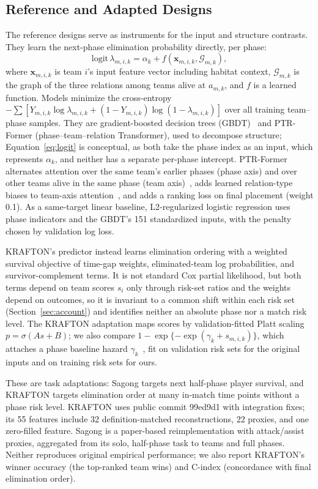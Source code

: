 \documentclass[sigconf,anonymous,nonacm]{acmart}
\begin{document}
\subsection{Reference and Adapted Designs}
\label{sec:method:rq2}
The reference designs serve as instruments for the input and structure contrasts. They learn the next-phase elimination probability directly, per phase:
\begin{equation}
\mathrm{logit}\,\lambda_{m,i,k}=\alpha_k+f(\mathbf{x}_{m,i,k},\mathcal{G}_{m,k}),
\label{eq:logit}
\end{equation}
where $\mathbf{x}_{m,i,k}$ is team $i$'s input feature vector including habitat context, $\mathcal{G}_{m,k}$ is the graph of the three relations among teams alive at $a_{m,k}$, and $f$ is a learned function.
Models minimize the cross-entropy $-\sum[Y_{m,i,k}\log\lambda_{m,i,k}+(1-Y_{m,i,k})\log(1-\lambda_{m,i,k})]$ over all training team--phase samples.
They are gradient-boosted decision trees (GBDT)~\cite{Friedman01} and PTR-Former (phase--team--relation Transformer), used to decompose structure; Equation~\eqref{eq:logit} is conceptual, as both take the phase index as an input, which represents $\alpha_k$, and neither has a separate per-phase intercept.
PTR-Former alternates attention over the same team's earlier phases (phase axis) and over other teams alive in the same phase (team axis)~\cite{Vaswani17,Ngiam22}, adds learned relation-type biases to team-axis attention~\cite{Ying21}, and adds a ranking loss on final placement (weight 0.1). As a same-target linear baseline, L2-regularized logistic regression uses phase indicators and the GBDT's 151 standardized inputs, with the penalty chosen by validation log loss.

KRAFTON's predictor instead learns elimination ordering with a weighted survival objective of time-gap weights, eliminated-team log probabilities, and survivor-complement terms. It is not standard Cox partial likelihood, but both terms depend on team scores $s_i$ only through risk-set ratios and the weights depend on outcomes, so it is invariant to a common shift within each risk set (Section~\ref{sec:account}) and identifies neither an absolute phase nor a match risk level. The KRAFTON adaptation maps scores by validation-fitted Platt scaling $p=\sigma(A s+B)$; we also compare $1-\exp\{-\exp(\gamma_k+s_{m,i,k})\}$, which attaches a phase baseline hazard $\gamma_k$~\cite{PrenticeGloeckler78}, fit on validation risk sets for the original inputs and on training risk sets for ours.

These are task adaptations: Sagong targets next half-phase player survival, and KRAFTON targets elimination order at many in-match time points without a phase risk level. KRAFTON uses public commit 99ed9d1 with integration fixes; its 55 features include 32 definition-matched reconstructions, 22 proxies, and one zero-filled feature. Sagong is a paper-based reimplementation with attack/assist proxies, aggregated from its solo, half-phase task to teams and full phases. Neither reproduces original empirical performance; we also report KRAFTON's winner accuracy (the top-ranked team wins) and C-index (concordance with final elimination order).
\end{document}
